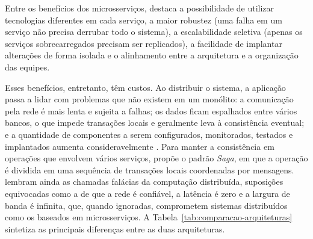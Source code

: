 Entre os benefícios dos microsserviços,  destaca a possibilidade de
utilizar tecnologias diferentes em cada serviço, a maior robustez (uma falha em um serviço
não precisa derrubar todo o sistema), a escalabilidade seletiva (apenas os serviços
sobrecarregados precisam ser replicados), a facilidade de implantar alterações de forma
isolada e o alinhamento entre a arquitetura e a organização das equipes.

Esses benefícios, entretanto, têm custos. Ao distribuir o sistema, a aplicação passa a lidar
com problemas que não existem em um monólito: a comunicação pela rede é mais lenta e sujeita a
falhas; os dados ficam espalhados entre vários bancos, o que impede transações locais e
geralmente leva à consistência eventual; e a quantidade de componentes a serem configurados,
monitorados, testados e implantados aumenta consideravelmente \cite{newman2021}. Para manter a
consistência em operações que envolvem vários serviços,  propõe o
padrão \textit{Saga}, em que a operação é dividida em uma sequência de transações locais
coordenadas por mensagens.  lembram ainda as chamadas falácias da
computação distribuída, suposições equivocadas como a de que a rede é confiável, a latência
é zero e a largura de banda é infinita, que, quando ignoradas, comprometem sistemas
distribuídos como os baseados em microsserviços. A Tabela~\ref{tab:comparacao-arquiteturas}
sintetiza as principais diferenças entre as duas arquiteturas.

